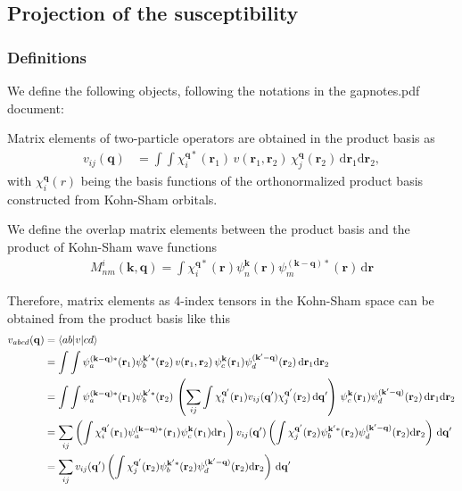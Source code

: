 \documentclass[12pt,a4paper]{scrartcl}
\numberwithin{equation}{section}
\renewcommand{\vec}{\mathbf}
\begin{document}

\clearpage
\subsection{Projection of the susceptibility}
\subsubsection{Definitions}
We define the following objects, following the notations in the gapnotes.pdf document:

Matrix elements of two-particle operators are obtained in the product basis as
\begin{align}
 v_{ij}(\vec{q}) &= \int\int \chi^{\vec{q}*}_i(\vec{r}_1) \, v(\vec{r}_1,\vec{r}_2) \, \chi^{\vec{q}}_j(\vec{r}_2) \,\mathrm{d}\vec{r}_1\mathrm{d}\vec{r}_2,
\end{align}
with $\chi^{\vec{q}}_i(r)$ being the basis functions of the orthonormalized product basis constructed from
Kohn-Sham orbitals.

We define the overlap matrix elements between the product basis and the product of Kohn-Sham wave functions
\begin{align}
 M^i_{nm}(\vec{k},\vec{q}) = \int \chi^{\vec{q}*}_i(\vec{r}) \psi^\vec{k}_{n}(\vec{r})\psi^{(\vec{k}-\vec{q})*}_{m}(\vec{r}) \, \mathrm{d}\vec{r}
\end{align}

Therefore, matrix elements as 4-index tensors in the Kohn-Sham space can be obtained from the product basis like this
\begin{align}
 v_{abcd}(\vec{q})
 &= \braket{ab|v|cd} \\
 &= \int\int \psi^{(\vec{k}-\vec{q})*}_a(\vec{r}_1) \psi^{\vec{k}'*}_b(\vec{r}_2) \, v(\vec{r}_1,\vec{r}_2) \, \psi^{\vec{k}}_c(\vec{r}_1) \psi^{(\vec{k}'-\vec{q})}_d(\vec{r}_2) \,\mathrm{d}\vec{r}_1\mathrm{d}\vec{r}_2 \\
 &= \int\int \psi^{(\vec{k}-\vec{q})*}_a(\vec{r}_1) \psi^{\vec{k}'*}_b(\vec{r}_2) \, 
 \left( \sum_{ij} \int \chi^{\vec{q'}}_i(\vec{r}_1) v_{ij}(\vec{q'})  \chi^{\vec{q'}}_j(\vec{r}_2)\,\mathrm{d}\vec{q'} \right)\, \psi^{\vec{k}}_c(\vec{r}_1) \psi^{(\vec{k}'-\vec{q})}_d(\vec{r}_2) \,\mathrm{d}\vec{r}_1\mathrm{d}\vec{r}_2 \\
 &= \sum_{ij}  \left( \int\chi^{\vec{q'}}_i(\vec{r}_1) \psi^{(\vec{k}-\vec{q})*}_a(\vec{r}_1)\psi^{\vec{k}}_c(\vec{r}_1)\mathrm{d}\vec{r}_1 \right) 
   v_{ij}(\vec{q'})  
  \left( \int \chi^{\vec{q'}}_j(\vec{r}_2) \psi^{\vec{k}'*}_b(\vec{r}_2) \psi^{(\vec{k}'-\vec{q})}_d(\vec{r}_2) \mathrm{d}\vec{r}_2 \right) \,\mathrm{d}\vec{q'} \\
%
&= \sum_{ij}    v_{ij}(\vec{q'})  
  \left( \int \chi^{\vec{q'}}_j(\vec{r}_2) \psi^{\vec{k}'*}_b(\vec{r}_2) \psi^{(\vec{k}'-\vec{q})}_d(\vec{r}_2) \mathrm{d}\vec{r}_2 \right) \,\mathrm{d}\vec{q'} \\
\end{align}
\end{document}
